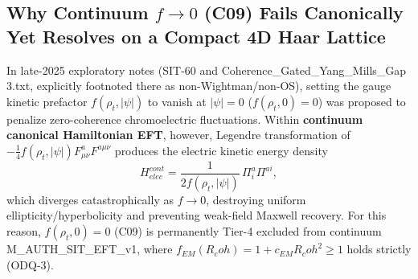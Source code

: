\documentclass[american,11pt,letterpaper]{article}
\newcommand{\Rcoh}{R_{\mathrm{coh}}}
\def\mathcal#1{#1}%
\def\mathrm#1{#1}%
\def\texttt#1{#1}%
\def\Rcoh{R_coh}%
\begin{document}
\subsection{Why Continuum $f \to 0$ (\texttt{C09}) Fails Canonically Yet Resolves on a Compact 4D Haar Lattice}

In late-2025 exploratory notes (\texttt{SIT-60} and \texttt{Coherence\_\allowbreak{}Gated\_\allowbreak{}Yang\_\allowbreak{}Mills\_\allowbreak{}Gap 3.\allowbreak{}txt}, explicitly footnoted there as non-Wightman/non-OS), setting the gauge kinetic prefactor $f(\rho_t, |\psi|)$ to vanish at $|\psi| = 0$ ($f(\rho_t, 0) = 0$) was proposed to penalize zero-coherence chromoelectric fluctuations. Within \textbf{continuum canonical Hamiltonian EFT}, however, Legendre transformation of $-\frac{1}{4}f(\rho_t,|\psi|)F_{\mu\nu}^a F^{a\mu\nu}$ produces the electric kinetic energy density
\begin{equation}
\mathcal{H}_{\mathrm{elec}}^{\mathrm{cont}} = \frac{1}{2 f(\rho_t, |\psi|)}\,\Pi_i^a \Pi^{ai},
\label{eq:continuum_pi_over_f_singularity}
\end{equation}
which diverges catastrophically as $f \to 0$, destroying uniform ellipticity/hyperbolicity and preventing weak-field Maxwell recovery. For this reason, $f(\rho_t,0) = 0$ (\texttt{C09}) is permanently Tier-4 excluded from continuum \texttt{M\_AUTH\_SIT\_EFT\_v1}, where $f_{\mathrm{EM}}(\Rcoh) = 1 + c_{\mathrm{EM}}\Rcoh^2 \ge 1$ holds strictly (\texttt{ODQ-3}).
\end{document}
